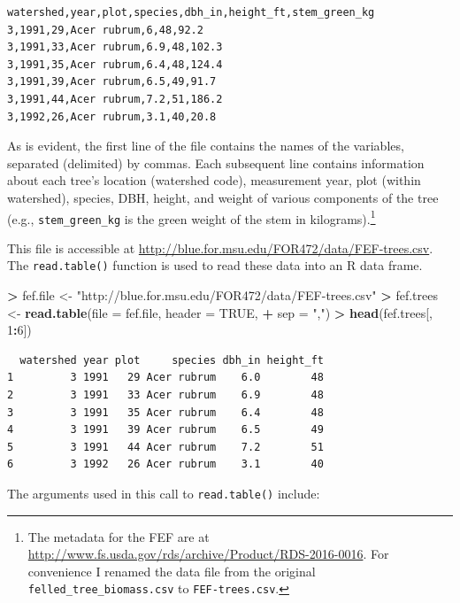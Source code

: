 \documentclass[]{krantz}
\makeatletter
\newenvironment{Shaded}{\begin{snugshade}}{\end{snugshade}}
\newcommand{\DataTypeTok}[1]{\textcolor[rgb]{0.27,0.27,0.27}{#1}}
\newcommand{\DecValTok}[1]{\textcolor[rgb]{0.06,0.06,0.06}{#1}}
\newcommand{\KeywordTok}[1]{\textcolor[rgb]{0.27,0.27,0.27}{\textbf{#1}}}
\newcommand{\NormalTok}[1]{#1}
\newcommand{\OperatorTok}[1]{\textcolor[rgb]{0.43,0.43,0.43}{\textbf{#1}}}
\newcommand{\OtherTok}[1]{\textcolor[rgb]{0.37,0.37,0.37}{#1}}
\newcommand{\StringTok}[1]{\textcolor[rgb]{0.5,0.5,0.5}{#1}}
\newenvironment{kframe}{%
\medskip{}
\setlength{\fboxsep}{.8em}
 \def\at@end@of@kframe{}%
 \ifinner\ifhmode%
  \def\at@end@of@kframe{\end{minipage}}%
  \begin{minipage}{\columnwidth}%
 \fi\fi%
 \def\FrameCommand##1{\hskip\@totalleftmargin \hskip-\fboxsep
 \colorbox{shadecolor}{##1}\hskip-\fboxsep
     \hskip-\linewidth \hskip-\@totalleftmargin \hskip\columnwidth}%
 \MakeFramed {\advance\hsize-\width
   \@totalleftmargin\z@ \linewidth\hsize
   \@setminipage}}%
 {\par\unskip\endMakeFramed%
 \at@end@of@kframe}
\renewenvironment{Shaded}{\begin{kframe}}{\end{kframe}}
\makeatother
\begin{document}
\begin{verbatim}
watershed,year,plot,species,dbh_in,height_ft,stem_green_kg
3,1991,29,Acer rubrum,6,48,92.2
3,1991,33,Acer rubrum,6.9,48,102.3
3,1991,35,Acer rubrum,6.4,48,124.4
3,1991,39,Acer rubrum,6.5,49,91.7
3,1991,44,Acer rubrum,7.2,51,186.2
3,1992,26,Acer rubrum,3.1,40,20.8
\end{verbatim}

As is evident, the first line of the file contains the names of the variables, separated (delimited) by commas. Each subsequent line contains information about each tree's location (watershed code), measurement year, plot (within watershed), species, DBH, height, and weight of various components of the tree (e.g., \texttt{stem\_green\_kg} is the green weight of the stem in kilograms).\footnote{The metadata for the FEF are at \url{http://www.fs.usda.gov/rds/archive/Product/RDS-2016-0016}. For convenience I renamed the data file from the original \texttt{felled\_tree\_biomass.csv} to \texttt{FEF-trees.csv}.}

This file is accessible at \url{http://blue.for.msu.edu/FOR472/data/FEF-trees.csv}. The \texttt{read.table()} function is used to read these data into an R data frame.

\begin{Shaded}
\begin{Highlighting}[]
\OperatorTok{>}\StringTok{ }\NormalTok{fef.file <-}\StringTok{ "http://blue.for.msu.edu/FOR472/data/FEF-trees.csv"}
\OperatorTok{>}\StringTok{ }\NormalTok{fef.trees <-}\StringTok{ }\KeywordTok{read.table}\NormalTok{(}\DataTypeTok{file =}\NormalTok{ fef.file, }\DataTypeTok{header =} \OtherTok{TRUE}\NormalTok{, }
\OperatorTok{+}\StringTok{   }\DataTypeTok{sep =} \StringTok{","}\NormalTok{)}
\OperatorTok{>}\StringTok{ }\KeywordTok{head}\NormalTok{(fef.trees[, }\DecValTok{1}\OperatorTok{:}\DecValTok{6}\NormalTok{])}
\end{Highlighting}
\end{Shaded}

\begin{verbatim}
  watershed year plot     species dbh_in height_ft
1         3 1991   29 Acer rubrum    6.0        48
2         3 1991   33 Acer rubrum    6.9        48
3         3 1991   35 Acer rubrum    6.4        48
4         3 1991   39 Acer rubrum    6.5        49
5         3 1991   44 Acer rubrum    7.2        51
6         3 1992   26 Acer rubrum    3.1        40
\end{verbatim}

The arguments used in this call to \texttt{read.table()} include:
\end{document}
